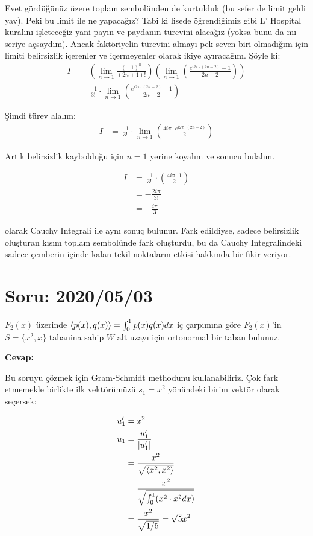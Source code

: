 \documentclass{article}
\numberwithin{equation}{section}
\begin{document}
Evet gördüğünüz üzere toplam sembolünden de kurtulduk (bu sefer de limit geldi yav). Peki bu limit ile ne yapacağız? Tabi ki lisede öğrendiğimiz gibi L' Hospital kuralını işleteceğiz yani payın ve paydanın türevini alacağız (yoksa bunu da mı seriye açsaydım). Ancak faktöriyelin türevini almayı pek seven biri olmadığım için limiti belirsizlik içerenler ve içermeyenler olarak ikiye ayıracağım. Şöyle ki: 
\begin{align}
I&= \left(\lim_{n \to 1} \frac{(-1)^n}{(2n+1)!} \right) \left(\lim_{n \to 1}\left( \frac{ e^{i2\pi\cdot (2n-2)} -  1  }{2n-2}\right)\right) \nonumber \\
&= \frac{-1}{3!} \cdot \lim_{n \to 1}\left( \frac{ e^{i2\pi\cdot (2n-2)} -  1  }{2n-2}\right)
\end{align} 

Şimdi türev alalım: 
\begin{align}
I&= \frac{-1}{3!} \cdot \lim_{n \to 1}\left( \frac{ 4i\pi\cdot e^{i2\pi\cdot (2n-2)}  }{2}\right)
\end{align} 

Artık belirsizlik kaybolduğu için $n=1$ yerine koyalım ve sonucu bulalım. 

\begin{align}
I&= \frac{-1}{3!} \cdot \left( \frac{ 4i\pi\cdot 1}{2}\right) \nonumber \\
&= -\frac{2i\pi}{3!}  \nonumber \\ 
&= -\frac{i\pi}{3}
\end{align}

olarak Cauchy Integrali ile aynı sonuç bulunur. Fark edildiyse, sadece belirsizlik oluşturan kısım toplam sembolünde fark oluşturdu, bu da Cauchy Integralindeki sadece çemberin içinde kalan tekil noktaların etkisi hakkında bir fikir veriyor. 

\section{Soru: 2020/05/03}
$F_2(x)$ üzerinde $\braket{p(x),q(x)} = \int_{0}^{1}p(x)q(x)dx$ iç çarpımına göre $F_2(x)$'in $S=\{x^2,x\}$ tabanina sahip $W$ alt uzayı için ortonormal bir taban bulunuz. 

\textbf{Cevap: }

Bu soruyu çözmek için Gram-Schmidt methodunu kullanabiliriz. Çok fark etmemekle birlikte ilk vektörümüzü $s_1 = x^2$ yönündeki birim vektör olarak seçersek: 

\begin{align}
	u_1^\prime &= x^2 \\
	u_1 &= \frac{u_1^\prime}{|u_1^\prime|} \nonumber\\
	&= \frac{x^2}{\sqrt{\braket{x^2,x^2}}}\nonumber \\
	&= \frac{x^2}{\sqrt{\int_{0}^{1}(x^2\cdot x^2 dx)}} \nonumber \\
	&= \frac{x^2}{\sqrt{1/5}} = \sqrt{5}x^2 
\end{align}
\end{document}
